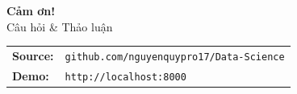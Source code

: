 \documentclass[aspectratio=169]{beamer}
\begin{document}
\begin{frame}
  \begin{center}
    \vspace{2em}
    {\Huge \textbf{Cảm ơn!}}\\
    \vspace{1em}
    {\large Câu hỏi \& Thảo luận}\\
    \vspace{2em}
    \begin{tabular}{ll}
      \textbf{Source:} & \texttt{github.com/nguyenquypro17/Data-Science} \\
      \textbf{Demo:}   & \texttt{http://localhost:8000} \\
    \end{tabular}
  \end{center}
\end{frame}
\end{document}
